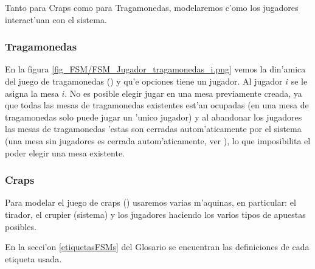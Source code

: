 \newcommand{\ronda}{\italica{FSM Ronda}}
\newcommand{\crupier}{\italica{FSM Crupier}}
\newcommand{\tirador}{\italica{FSM Tirador i}}
\newcommand{\dados}{\italica{FSM Dados i}}
\newcommand{\campo}{\italica{FSM Jugador i haciendo apuesta de Campo }}
\newcommand{\sitio}{\italica{FSM Jugador i haciendo apuesta de sitio}}
\newcommand{\pase}{\italica{FSM Jugador i haciendo apuesta linea de pase / barra No Pase}}
\newcommand{\venir}{\italica{FSM Jugador i haciendo apuesta venir / no venir}}

Tanto para Craps como para Tragamonedas, modelaremos c'omo los jugadores interact'uan con el sistema.

\subsubsection{Tragamonedas}

En la figura \ref{fig_FSM/FSM_Jugador_tragamonedas_i.png} vemos la din'amica del juego de tragamonedas () y qu'e opciones tiene un jugador.
Al jugador $i$ se le asigna la mesa $i$. No es posible elegir jugar en una mesa previamente creada, ya que todas las mesas de tragamonedas existentes est'an ocupadas (en una mesa de tragamonedas solo puede jugar un 'unico jugador) y al abandonar los jugadores las mesas de tragamonedas 'estas son cerradas autom'aticamente por el sistema (una mesa sin jugadores es cerrada autom'aticamente, ver ), lo que imposibilita el poder elegir una mesa existente.

\clearpage


\subsubsection{Craps}
\label{FSM:Craps}
Para modelar el juego de craps () usaremos varias m'aquinas, en particular: el tirador, el crupier (sistema) y los jugadores haciendo los varios tipos de apuestas posibles. 

En la secci'on \ref{etiquetasFSMs} del Glosario se encuentran las definiciones de cada etiqueta usada.


